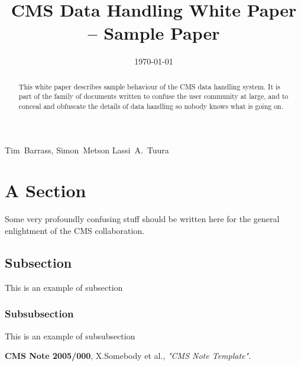 \documentclass{cmspaper}
\begin{document}
\begin{titlepage}
  \whitepaper %
  \date{\today} %
  \title{CMS Data Handling White Paper -- Sample Paper}

  \begin{Authlist}
    Tim~Barrass, Simon~Metson
    Lassi~A.~Tuura
  \end{Authlist}


  \begin{abstract}
    This white paper describes sample behaviour of the CMS data handling
    system.  It is part of the family of documents written to confuse the
    user community at large, and to conceal and obfuscate the details of
    data handling so nobody knows what is going on.
  \end{abstract} 

\end{titlepage}

\setcounter{page}{2}

\section{A Section}
Some very profoundly confusing stuff should be written here for the general
enlightment of the CMS collaboration.

\subsection{Subsection}
This is an example of subsection

\subsubsection{Subsubsection}
This is an example of subsubsection

\begin{thebibliography}{9}
   {\bf CMS Note 2005/000},
    X.Somebody et al.,
    {\em "CMS Note Template"}.
\end{thebibliography}
 
\end{document}
